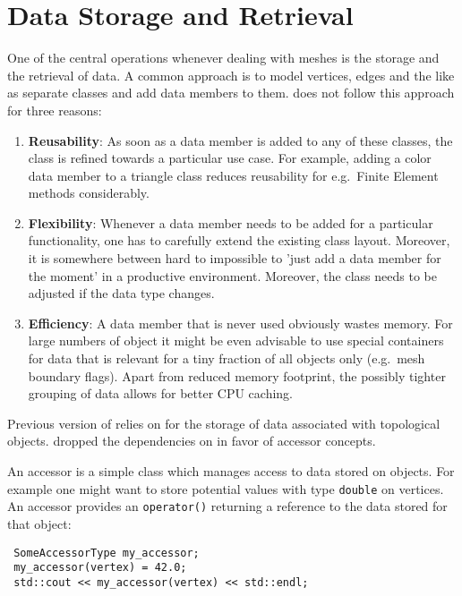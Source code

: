 \chapter{Data Storage and Retrieval} \label{chap:data}

One of the central operations whenever dealing with meshes is the storage and the retrieval of data.
A common approach is to model vertices, edges and the like as separate classes and add data members to them.
{\ViennaGrid} does not follow this approach for three reasons:
\begin{enumerate}
 \item \textbf{Reusability}: As soon as a data member is added to any of these classes, the class is refined towards a particular use case. For example, adding a color data member to a triangle class reduces reusability for e.g.~Finite Element methods considerably.
 \item \textbf{Flexibility}: Whenever a data member needs to be added for a particular functionality, one has to carefully extend the existing class layout. Moreover, it is somewhere between hard to impossible to 'just add a data member for the moment' in a productive environment. Moreover, the class needs to be adjusted if the data type changes.
 \item \textbf{Efficiency}: A data member that is never used obviously wastes memory. For large numbers of object it might be even advisable to use special containers for data that is relevant for a tiny fraction of all objects only (e.g.~mesh boundary flags). Apart from reduced memory footprint, the possibly tighter grouping of data allows for better CPU caching.
\end{enumerate}

Previous version of {\ViennaGrid} relies on {\ViennaData} \cite{ViennaData} for the storage of data associated with topological objects. {\ViennaGridversion} dropped the dependencies on {\ViennaData} in favor of accessor concepts.

An accessor is a simple class which manages access to data stored on objects. For example one might want to store potential values with type \lstinline|double| on vertices. An accessor provides an  \lstinline|operator()| returning a reference to the data stored for that object:

\begin{lstlisting}
 SomeAccessorType my_accessor;
 my_accessor(vertex) = 42.0;
 std::cout << my_accessor(vertex) << std::endl;
\end{lstlisting}

